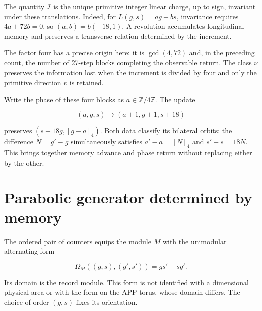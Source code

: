 The quantity \(\mathcal I\) is the unique primitive integer linear charge, up to sign, invariant under these translations. Indeed, for \(L(g,s)=ag+bs\), invariance requires \(4a+72b=0\), so \((a,b)=b(-18,1)\). A revolution accumulates longitudinal memory and preserves a transverse relation determined by the increment.

The factor four has a precise origin here: it is \(\gcd(4,72)\) and, in the preceding count, the number of 27-step blocks completing the observable return. The class \(\nu\) preserves the information lost when the increment is divided by four and only the primitive direction \(v\) is retained.

\begin{corollary}

Write the phase of these four blocks as \(a\in\mathbb Z/4\mathbb Z\). The update

\[
(a,g,s)\longmapsto(a+1,g+1,s+18)
\]

preserves \((s-18g,[g-a]_4)\). Both data classify its bilateral orbits: the difference \(N=g'-g\) simultaneously satisfies \(a'-a=[N]_4\) and \(s'-s=18N\). This brings together memory advance and phase return without replacing either by the other.
\end{corollary}

\section{Parabolic generator determined by memory}

The ordered pair of counters equips the module \(M\) with the unimodular alternating form

\[
\Omega_M((g,s),(g',s'))=gs'-sg'.
\]

Its domain is the record module. This form is not identified with a dimensional physical area or with the form on the APP torus, whose domain differs. The choice of order \((g,s)\) fixes its orientation.

